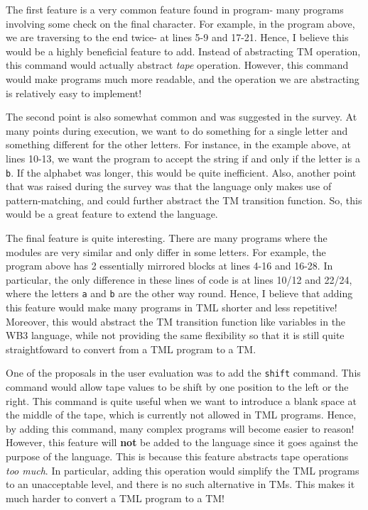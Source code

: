The first feature is a very common feature found in program- many programs involving some check on the final character. For example, in the program above, we are traversing to the end twice- at lines 5-9 and 17-21. Hence, I believe this would be a highly beneficial feature to add. Instead of abstracting TM operation, this command would actually abstract \textit{tape} operation. However, this command would make programs much more readable, and the operation we are abstracting is relatively easy to implement!

The second point is also somewhat common and was suggested in the survey. At many points during execution, we want to do something for a single letter and something different for the other letters. For instance, in the example above, at lines 10-13, we want the program to accept the string if and only if the letter is a \texttt{b}. If the alphabet was longer, this would be quite inefficient. Also, another point that was raised during the survey was that the language only makes use of pattern-matching, and could further abstract the TM transition function. So, this would be a great feature to extend the language. 

The final feature is quite interesting. There are many programs where the modules are very similar and only differ in some letters. For example, the program above has 2 essentially mirrored blocks at lines 4-16 and 16-28. In particular, the only difference in these lines of code is at lines 10/12 and 22/24, where the letters \texttt{a} and \texttt{b} are the other way round. Hence, I believe that adding this feature would make many programs in TML shorter and less repetitive! Moreover, this would abstract the TM transition function like variables in the WB3 language, while not providing the same flexibility so that it is still quite straightfoward to convert from a TML program to a TM.

One of the proposals in the user evaluation was to add the \texttt{shift} command. This command would allow tape values to be shift by one position to the left or the right. This command is quite useful when we want to introduce a blank space at the middle of the tape, which is currently not allowed in TML programs. Hence, by adding this command, many complex programs will become easier to reason! However, this feature will \textbf{not} be added to the language since it goes against the purpose of the language. This is because this feature abstracts tape operations \textit{too much}. In particular, adding this operation would simplify the TML programs to an unacceptable level, and there is no such alternative in TMs. This makes it much harder to convert a TML program to a TM!

